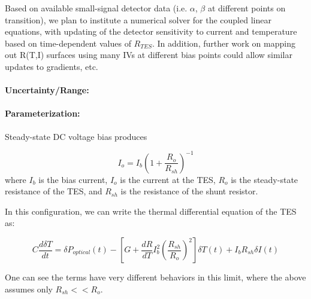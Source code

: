 Based on available small-signal detector data (i.e. $\alpha$, $\beta$ at different points on transition), we plan to institute a numerical solver for the coupled linear equations, with updating of the detector sensitivity to current and temperature based on time-dependent values of $R_{TES}$. In addition, further work on mapping out R(T,I) surfaces using many IVs at different bias points could allow similar updates to gradients, etc.

\paragraph{Uncertainty/Range:}

\paragraph{Parameterization:}

Steady-state DC voltage bias produces

\begin{equation}
I_o = I_b ( 1+ \frac{R_o}{R_{sh}} )^{-1}
\end{equation}
where $I_b$ is the bias current, $I_o$ is the current at the TES, $R_o$ is the steady-state resistance of the TES, and $R_{sh}$ is the resistance of the shunt resistor.

In this configuration, we can write the thermal differential equation of the TES as:

\begin{equation}
C \frac{d \delta T}{dt} = \delta P_{optical}(t) - \left[ G + \frac{dR}{dT} I_b^2 \left(\frac{R_{sh}}{R_o}\right)^2\right] \delta T(t) + I_b R_{sh} \delta I(t)
\end{equation}

One can see the terms have very different behaviors in this limit, where the above assumes only $R_{sh} << R_o$.